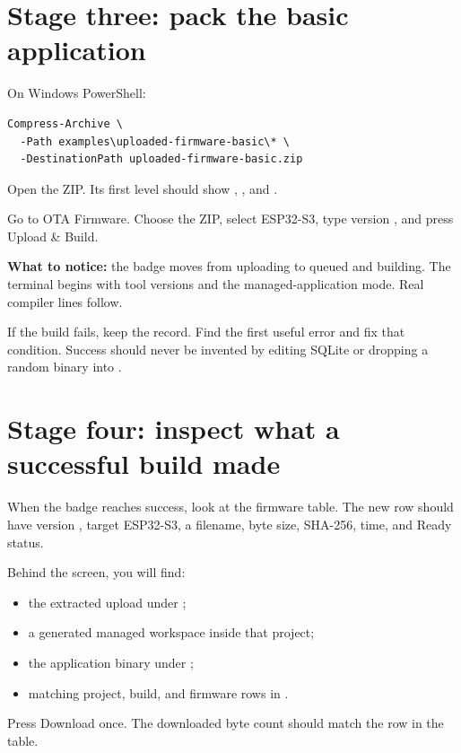 \section{Stage three: pack the basic application}

On Windows PowerShell:

\begin{lstlisting}
Compress-Archive \
  -Path examples\uploaded-firmware-basic\* \
  -DestinationPath uploaded-firmware-basic.zip
\end{lstlisting}

Open the ZIP. Its first level should show , , and .

Go to OTA Firmware. Choose the ZIP, select ESP32-S3, type version \codepath{1.0.1}, and press Upload \& Build.

\textbf{What to notice:} the badge moves from uploading to queued and building. The terminal begins with tool versions and the managed-application mode. Real compiler lines follow.

If the build fails, keep the record. Find the first useful error and fix that condition. Success should never be invented by editing SQLite or dropping a random binary into .

\section{Stage four: inspect what a successful build made}

When the badge reaches success, look at the firmware table. The new row should have version , target ESP32-S3, a filename, byte size, SHA-256, time, and Ready status.

Behind the screen, you will find:

\begin{itemize}
  \item the extracted upload under ;
  \item a generated managed workspace inside that project;
  \item the application binary under \codepath{firmware-builds};
  \item matching project, build, and firmware rows in .
\end{itemize}

Press Download once. The downloaded byte count should match the row in the table.

